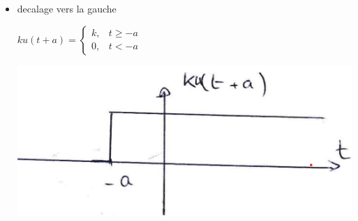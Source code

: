 \documentclass[12pt]{book}
\begin{document}
\begin{itemize}
\begin{itemize}
\begin{center}
\begin{minipage}{0.39\linewidth}
                            \end{minipage}
                        \end{center}
                        \item decalage vers la gauche 
                        \begin{center}
                            \begin{minipage}{0.49\linewidth}
                                $ku(t+a) = 
                                \begin{cases}
                                    k, & t \geq -a \\
                                    0, & t < -a
                                \end{cases}
                                $
                            \end{minipage}
                            \begin{minipage}{0.39\linewidth}
                                \includegraphics[width = \linewidth]{pic/gauchedecalageunite.png}
                            \end{minipage}
                        \end{center}
                    \end{itemize}
            \end{itemize}
\end{document}
